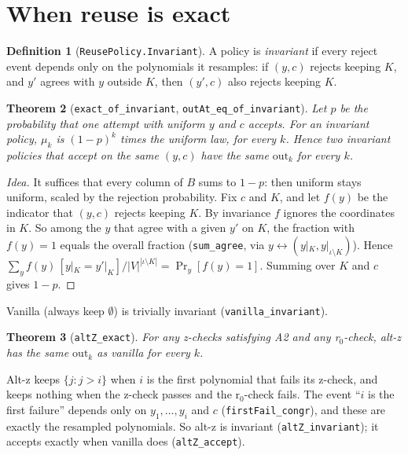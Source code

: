 \documentclass[11pt]{article}
\newtheorem{theorem}{Theorem}
\theoremstyle{definition}
\newtheorem{definition}[theorem]{Definition}
\theoremstyle{remark}
\newcommand{\lean}[1]{\texttt{#1}}
\renewcommand{\Pr}{\mathop{\mathrm{Pr}}}
\begin{document}
\section{When reuse is exact}\label{sec:exact}

\begin{definition}[\lean{ReusePolicy.Invariant}]
A policy is \emph{invariant} if every reject event depends only on the polynomials it resamples:
if $(y,c)$ rejects keeping $K$, and $y'$ agrees with $y$ outside $K$, then $(y',c)$ also rejects
keeping $K$.
\end{definition}

\begin{theorem}[\lean{exact\_of\_invariant}, \lean{outAt\_eq\_of\_invariant}]
Let $p$ be the probability that one attempt with uniform $y$ and $c$ accepts. For an invariant
policy, $\mu_k$ is $(1-p)^k$ times the uniform law, for every $k$. Hence two invariant policies
that accept on the same $(y,c)$ have the same $\mathrm{out}_k$ for every $k$.
\end{theorem}

\begin{proof}[Idea]
It suffices that every column of $B$ sums to $1-p$: then uniform stays uniform, scaled by the
rejection probability. Fix $c$ and $K$, and let $f(y)$ be the indicator that $(y,c)$ rejects
keeping $K$. By invariance $f$ ignores the coordinates in $K$. So among the $y$ that agree with a
given $y'$ on $K$, the fraction with $f(y)=1$ equals the overall fraction (\lean{sum\_agree},
via $y \leftrightarrow (y|_K, y|_{\iota\setminus K})$). Hence
$\sum_y f(y)\,[y|_K = y'|_K]/|V|^{|\iota\setminus K|} = \Pr_y[f(y)=1]$. Summing over $K$ and $c$
gives $1-p$.
\end{proof}

Vanilla (always keep $\emptyset$) is trivially invariant (\lean{vanilla\_invariant}).

\begin{theorem}[\lean{altZ\_exact}]
For any z-checks satisfying A2 and any r$_0$-check, alt-z has the same $\mathrm{out}_k$ as
vanilla for every $k$.
\end{theorem}
Alt-z keeps $\{j : j > i\}$ when $i$ is the first polynomial that fails its z-check, and keeps
nothing when the z-check passes and the r$_0$-check fails. The event ``$i$ is the first failure''
depends only on $y_1,\dots,y_i$ and $c$ (\lean{firstFail\_congr}), and these are exactly the
resampled polynomials. So alt-z is invariant (\lean{altZ\_invariant}); it accepts exactly when
vanilla does (\lean{altZ\_accept}).
\end{document}
